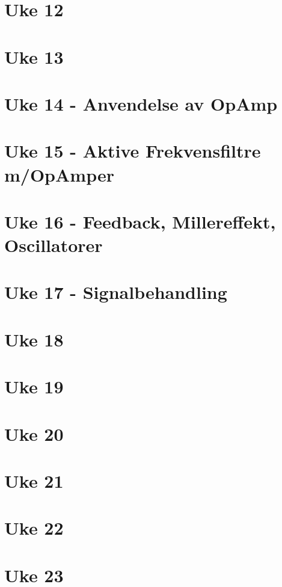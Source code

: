 \documentclass{article}
\begin{document}
  \section{Uke 12}
    
  \section{Uke 13}
    
  \section{Uke 14 - Anvendelse av OpAmp}
    
  \section{Uke 15 - Aktive Frekvensfiltre m/OpAmper}
    
  \section{Uke 16 - Feedback, Millereffekt, Oscillatorer}
    
  \section{Uke 17 - Signalbehandling}
    
  \section{Uke 18}
  \section{Uke 19}
  \section{Uke 20}
  \section{Uke 21}
  \section{Uke 22}
  \section{Uke 23}
\end{document}
